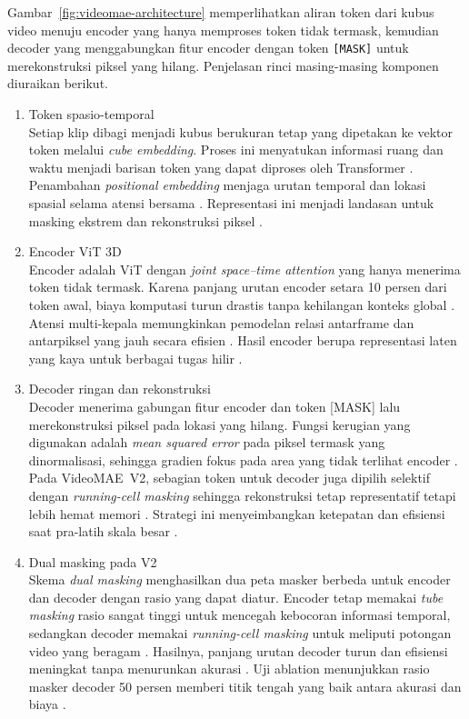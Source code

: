 Gambar~\ref{fig:videomae-architecture} memperlihatkan aliran token dari kubus video menuju encoder yang hanya memproses token tidak termask, kemudian decoder yang menggabungkan fitur encoder dengan token \texttt{[MASK]} untuk merekonstruksi piksel yang hilang. Penjelasan rinci masing-masing komponen diuraikan berikut.
\begin{enumerate}
\item Token spasio-temporal\\
Setiap klip dibagi menjadi kubus berukuran tetap yang dipetakan ke vektor token melalui \textit{cube embedding}. Proses ini menyatukan informasi ruang dan waktu menjadi barisan token yang dapat diproses oleh Transformer \cite{Tong2022VideoMAE}. Penambahan \textit{positional embedding} menjaga urutan temporal dan lokasi spasial selama atensi bersama \cite{Tong2022VideoMAE}. Representasi ini menjadi landasan untuk masking ekstrem dan rekonstruksi piksel \cite{Tong2022VideoMAE}.

\item Encoder ViT 3D\\
Encoder adalah ViT dengan \textit{joint space--time attention} yang hanya menerima token tidak termask. Karena panjang urutan encoder setara 10 persen dari token awal, biaya komputasi turun drastis tanpa kehilangan konteks global \cite{Tong2022VideoMAE}. Atensi multi-kepala memungkinkan pemodelan relasi antarframe dan antarpiksel yang jauh secara efisien \cite{Tong2022VideoMAE}. Hasil encoder berupa representasi laten yang kaya untuk berbagai tugas hilir \cite{Tong2022VideoMAE}.

\item Decoder ringan dan rekonstruksi\\
Decoder menerima gabungan fitur encoder dan token [MASK] lalu merekonstruksi piksel pada lokasi yang hilang. Fungsi kerugian yang digunakan adalah \textit{mean squared error} pada piksel termask yang dinormalisasi, sehingga gradien fokus pada area yang tidak terlihat encoder \cite{Tong2022VideoMAE}. Pada VideoMAE~V2, sebagian token untuk decoder juga dipilih selektif dengan \textit{running-cell masking} sehingga rekonstruksi tetap representatif tetapi lebih hemat memori \cite{Wang2023VideoMAEv2}. Strategi ini menyeimbangkan ketepatan dan efisiensi saat pra-latih skala besar \cite{Wang2023VideoMAEv2}.

\item Dual masking pada V2\\
Skema \textit{dual masking} menghasilkan dua peta masker berbeda untuk encoder dan decoder dengan rasio yang dapat diatur. Encoder tetap memakai \textit{tube masking} rasio sangat tinggi untuk mencegah kebocoran informasi temporal, sedangkan decoder memakai \textit{running-cell masking} untuk meliputi potongan video yang beragam \cite{Wang2023VideoMAEv2}. Hasilnya, panjang urutan decoder turun dan efisiensi meningkat tanpa menurunkan akurasi \cite{Wang2023VideoMAEv2}. Uji ablation menunjukkan rasio masker decoder 50 persen memberi titik tengah yang baik antara akurasi dan biaya \cite{Wang2023VideoMAEv2}.
\end{enumerate}

